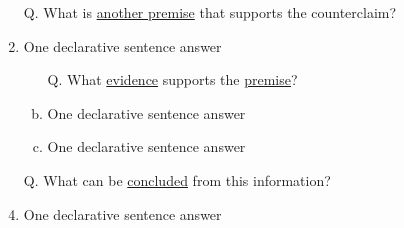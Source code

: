 \documentclass[a4paper, 12pt]{article}
\begin{document}
\begin{enumerate}[I.]
\begin{enumerate}[A.]
\begin{enumerate}[1.]
\begin{enumerate}[a.]
                              \end{enumerate}
                        \item [Q.] What is \underline{another premise} that supports the {\color{red}counterclaim}?
                        \item{\color{gray} One declarative sentence answer} %
                              \begin{enumerate}[a.]
                                  \item [Q.] What \underline{evidence} supports the \underline{premise}?
                                  \item {\color{gray} One declarative sentence answer} %
                                  \item {\color{gray} One declarative sentence answer} %
                              \end{enumerate}
                        \item [Q.] What can be \underline{concluded} from this information?
                        \item {\color{gray} One declarative sentence answer} %
                    \end{enumerate}
          \end{enumerate}


\end{enumerate}
\end{document}
